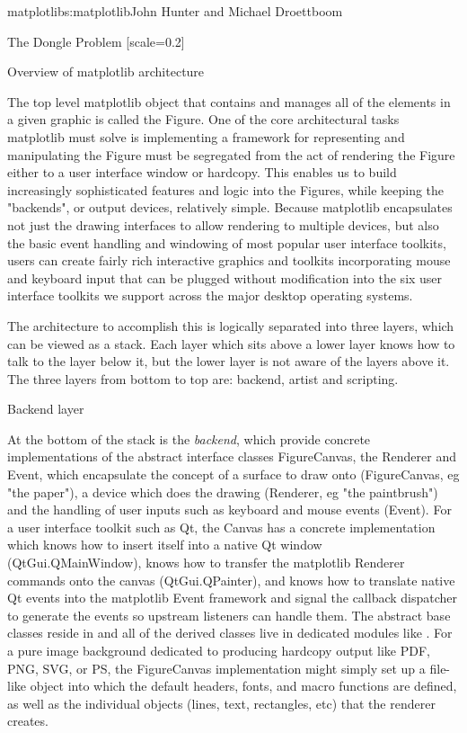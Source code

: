 \begin{aosachapter}{matplotlib}{s:matplotlib}{John Hunter and Michael Droettboom}
\begin{aosasect1}{The Dongle Problem}
[scale=0.2]
\end{aosasect1}

\begin{aosasect1}{Overview of matplotlib architecture}


The top level matplotlib object that contains and manages all of the
elements in a given graphic is called the Figure.  One of the core
architectural tasks matplotlib must solve is implementing a framework
for representing and manipulating the Figure must be segregated from
the act of rendering the Figure either to a user interface window or
hardcopy.  This enables us to build increasingly sophisticated
features and logic into the Figures, while keeping the "backends", or
output devices, relatively simple.  Because matplotlib encapsulates
not just the drawing interfaces to allow rendering to multiple
devices, but also the basic event handling and windowing of most
popular user interface toolkits, users can create fairly rich
interactive graphics and toolkits incorporating mouse and keyboard
input that can be plugged without modification into the six user
interface toolkits we support across the major desktop operating
systems.

The architecture to accomplish this is logically separated into three
layers, which can be viewed as a stack.  Each layer which sits above a
lower layer knows how to talk to the layer below it, but the lower
layer is not aware of the layers above it.  The three layers from
bottom to top are: backend, artist and scripting.

\begin{aosasect2}{Backend layer}

At the bottom of the stack is the \emph{backend}, which provide
concrete implementations of the abstract interface classes
FigureCanvas, the Renderer and Event, which encapsulate the concept of
a surface to draw onto (FigureCanvas, eg "the paper"), a device which
does the drawing (Renderer, eg "the paintbrush") and the handling of
user inputs such as keyboard and mouse events (Event).  For a user
interface toolkit such as Qt, the Canvas has a concrete implementation
which knows how to insert itself into a native Qt window
(QtGui.QMainWindow), knows how to transfer the matplotlib Renderer
commands onto the canvas (QtGui.QPainter), and knows how to translate
native Qt events into the matplotlib Event framework and signal the
callback dispatcher to generate the events so upstream listeners can
handle them.  The abstract base classes reside in
 and all of the derived classes live in
dedicated modules like .  For
a pure image background dedicated to producing hardcopy output like
PDF, PNG, SVG, or PS, the FigureCanvas implementation might simply set
up a file-like object into which the default headers, fonts, and macro
functions are defined, as well as the individual objects (lines, text,
rectangles, etc) that the renderer creates.


\end{aosasect2}
\end{aosasect1}
\end{aosachapter}
